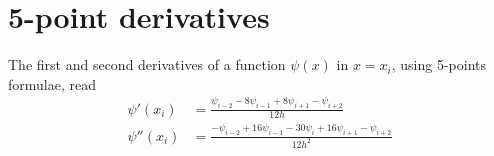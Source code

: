 \section{5-point derivatives}\label{app:5p_derivatives}
The first and second derivatives of a function $\psi(x)$ in $x=x_i$, using 5-points formulae, read
\begin{align}
    \label{eq:5p_first_derivative}
    \psi'(x_i) &= \frac{\psi_{i-2} - 8\psi_{i-1} + 8\psi_{i+1} - \psi_{i+2}}{12h}
    \\ \label{eq:5p_second_derivative}
    \psi''(x_i) &= \frac{-\psi_{i-2} + 16\psi_{i-1} -30\psi_i + 16\psi_{i+1} - \psi_{i+2}}{12h^2}
\end{align}